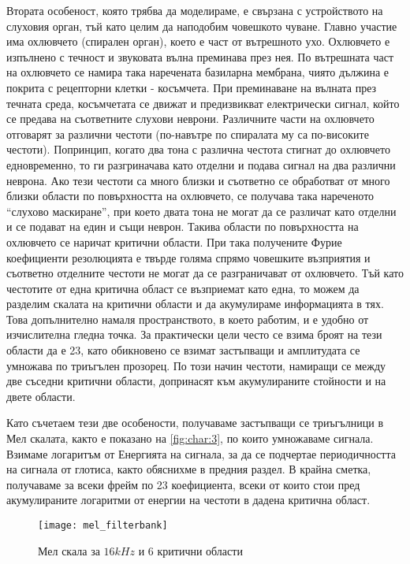 \documentclass[main.tex]{subfiles}
\begin{document}
    Втората особеност, която трябва да моделираме, е свързана с устройството на слуховия орган, тъй като целим да наподобим човешкото чуване. Главно участие има охлювчето (спирален орган), което е част от вътрешното ухо. Охлювчето е изпълнено с течност и звуковата вълна преминава през нея. По вътрешната част на охлювчето се намира така наречената базиларна мембрана, чиято дължина е покрита с рецепторни клетки - косъмчета. При преминаване на вълната през течната среда, косъмчетата се движат и предизвикват електрически сигнал, който се предава на съответните слухови неврони. Различните части на охлювчето отговарят за различни честоти (по-навътре по спиралата му са по-високите честоти). Попринцип, когато два тона с различна честота стигнат до охлювчето едновременно, то ги разгриначава като отделни и подава сигнал на два различни неврона. Ако тези честоти са много близки и съответно се обработват от много близки области по повърхността на охлювчето, се получава така нареченото ``слухово маскиране'', при което двата тона не могат да се различат като отделни и се подават на един и същи неврон. Такива области по повърхността на охлювчето се наричат критични области. 
    При така получените Фурие коефициенти резолюцията е твърде голяма спрямо човешките възприятия и съответно отделните честоти не могат да се разграничават от охлювчето. Тъй като честотите от една критична област се възприемат като една, то можем да разделим скалата на критични области и да акумулираме информацията в тях. Това допълнително намаля пространството, в което работим, и е удобно от изчислителна гледна точка. За практически цели често се взима броят на тези области да е 23, като обикновено се взимат застъпващи и амплитудата се умножава по триъгълен прозорец. По този начин честоти, намиращи се между две съседни критични области, допринасят към акумулираните стойности и на двете области.
    
    Като съчетаем тези две особености, получаваме застъпващи се триъгълници в Мел скалата, както е показано на \autoref{fig:char:3}, по които умножаваме сигнала. Взимаме логаритъм от Енергията на сигнала, за да се подчертае периодичността на сигнала от глотиса, както обяснихме в предния раздел.
    В крайна сметка, получаваме за всеки фрейм по 23 коефициента, всеки от които стои пред акумулираните логаритми от енергии на честоти в дадена критична област.

    \begin{figure}[H]
        \centering
        \texttt{[image: mel\_filterbank]}%
        \caption{Мел скала за $16kHz$ и 6 критични области}
        \label{fig:char:3}
    \end{figure}
\end{document}
